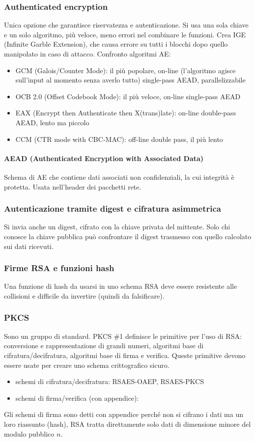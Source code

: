 \documentclass[11pt]{article}
\begin{document}
\subsubsection{Authenticated encryption}
Unica opzione che garantisce riservatezza e autenticazione. Si usa una sola chiave e un solo algoritmo, più veloce, meno 
errori nel combinare le funzioni. Crea IGE (Infinite Garble Extension), che causa errore su tutti i blocchi dopo quello 
manipolato in caso di attacco.
Confronto algoritmi AE:
\begin{itemize}
    \item GCM (Galois/Counter Mode): il più popolare, on-line (l'algoritmo agisce sull'input al momento senza averlo tutto)
    single-pass AEAD, parallelizzabile
    \item OCB 2.0 (Offset Codebook Mode): il più veloce, on-line single-pass AEAD
    \item EAX (Encrypt then Authenticate then X(trans)late): on-line double-pass AEAD, lento ma piccolo
    \item CCM (CTR mode with CBC-MAC): off-line double pass, il più lento
\end{itemize}
\paragraph*{AEAD (Authenticated Encryption with Associated Data)}
Schema di AE che contiene dati associati non confidenziali, la cui integrità è protetta. Usata nell'header dei pacchetti rete.
\subsubsection{Autenticazione tramite digest e cifratura asimmetrica}
Si invia anche un digest, cifrato con la chiave privata del mittente. Solo chi conosce la chiave pubblica può confrontare 
il digest trasmesso con quello calcolato sui dati ricevuti.
\subsubsection{Firme RSA e funzioni hash}
Una funzione di hash da usarsi in uno schema RSA deve essere resistente alle collisioni e difficile da invertire (quindi 
da falsificare).
\subsubsection{PKCS}
Sono un gruppo di standard. PKCS \#1 definisce le primitive per l'uso di RSA: conversione e rappresentazione di grandi 
numeri, algoritmi base di cifratura/decifratura, algoritmi base di firma e verifica. Queste primitive devono essere usate 
per creare uno schema crittografico sicuro.
\begin{itemize}
    \item schemi di cifratura/decifratura: RSAES-OAEP, RSAES-PKCS 
    \item schemi di firma/verifica (con appendice):
\end{itemize}
Gli schemi di firma sono detti con appendice perché non si cifrano i dati ma un loro riassunto (hash), RSA tratta direttamente 
solo dati di dimensione minore del modulo pubblico $n$.
\end{document}
